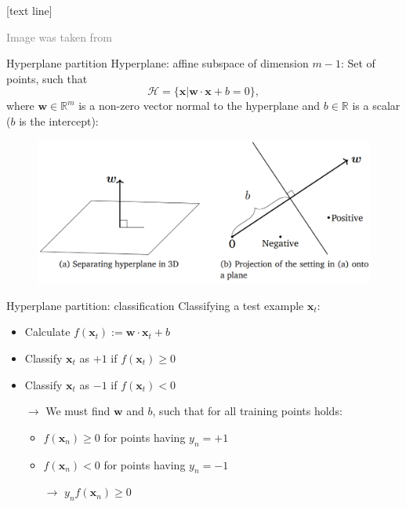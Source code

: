 \documentclass[dvipsnames]{beamer}
\newcommand{\referencefootnote}[1]{\setbeamertemplate{footline}[text line]{%
\parbox{0.9\paperwidth}{\vspace*{-23pt}\tiny{\textcolor{gray}{#1}}\hfill\scriptsize\insertframenumber}}}
\begin{document}
		{ \referencefootnote{Image was taken from \cite{deisenroth_faisal_ong_2020}}
		\begin{frame}{Hyperplane partition}
			Hyperplane: affine subspace of dimension $m-1$: Set of points, such that
			\[
				\mathcal{H} = \{\mathbf{x}|\mathbf{w}\cdot \mathbf{x} + b = 0\},
			\]
			where $\mathbf{w} \in \mathbb{R}^m$ is a non-zero vector normal to the hyperplane and $b\in \mathbb{R}$ is a scalar ($b$ is the intercept):
			 \begin{figure}
					\center
					\includegraphics[scale=.3]{figures/hyperplane.png}
        \end{figure}

    \end{frame}
		}
		
		\begin{frame}{Hyperplane partition: classification}
				Classifying a test example $\mathbf{x}_t$:
				\begin{itemize}
					\item Calculate $f(\mathbf{x}_t):= \mathbf{w}\cdot \mathbf{x}_t + b$ %
					\item Classify $\mathbf{x}_t$ as $+1$ if $f(\mathbf{x}_t)\geq 0$ %
					\item Classify $\mathbf{x}_t$ as $-1$ if $f(\mathbf{x}_t)< 0$ %
				\end{itemize}
				\begin{itemize}
					\item[$\rightarrow$] We must find $\mathbf{w}$ and $b$, such that for all training points holds:
					\begin{itemize}
						\item $f(\mathbf{x}_n)\geq0$ for points having $y_n = +1$
						\item $f(\mathbf{x}_n)<0$ for points having $y_n = -1$
						\item[$\rightarrow$] $y_{n} f(\mathbf{x}_n)\geq0$
					\end{itemize}
				\end{itemize}
			\end{frame}
		
\end{document}
